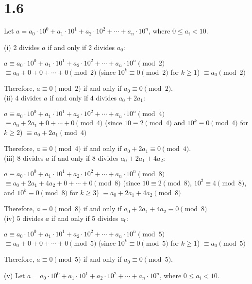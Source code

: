 \documentclass{article}
\begin{document}
\section{1.6}
\begin{solution}
    Let $a = a_0 \cdot 10^0 + a_1 \cdot 10^1 + a_2 \cdot 10^2 + \cdots + a_n \cdot 10^n$, where $0 \leq a_i < 10$.

(i) 2 divides $a$ if and only if 2 divides $a_0$:

$a \equiv a_0 \cdot 10^0 + a_1 \cdot 10^1 + a_2 \cdot 10^2 + \cdots + a_n \cdot 10^n \pmod{2}$
$\equiv a_0 + 0 + 0 + \cdots + 0 \pmod{2}$ (since $10^k \equiv 0 \pmod{2}$ for $k \geq 1$)
$\equiv a_0 \pmod{2}$

Therefore, $a \equiv 0 \pmod{2}$ if and only if $a_0 \equiv 0 \pmod{2}$. \\

(ii) 4 divides $a$ if and only if 4 divides $a_0 + 2a_1$:

$a \equiv a_0 \cdot 10^0 + a_1 \cdot 10^1 + a_2 \cdot 10^2 + \cdots + a_n \cdot 10^n \pmod{4}$
$\equiv a_0 + 2a_1 + 0 + \cdots + 0 \pmod{4}$ (since $10 \equiv 2 \pmod{4}$ and $10^k \equiv 0 \pmod{4}$ for $k \geq 2$)
$\equiv a_0 + 2a_1 \pmod{4}$

Therefore, $a \equiv 0 \pmod{4}$ if and only if $a_0 + 2a_1 \equiv 0 \pmod{4}$. \\ 

(iii) 8 divides $a$ if and only if 8 divides $a_0 + 2a_1 + 4a_2$:

$a \equiv a_0 \cdot 10^0 + a_1 \cdot 10^1 + a_2 \cdot 10^2 + \cdots + a_n \cdot 10^n \pmod{8}$
$\equiv a_0 + 2a_1 + 4a_2 + 0 + \cdots + 0 \pmod{8}$ (since $10 \equiv 2 \pmod{8}$, $10^2 \equiv 4 \pmod{8}$, and $10^k \equiv 0 \pmod{8}$ for $k \geq 3$)
$\equiv a_0 + 2a_1 + 4a_2 \pmod{8}$

Therefore, $a \equiv 0 \pmod{8}$ if and only if $a_0 + 2a_1 + 4a_2 \equiv 0 \pmod{8}$ \\

(iv) 5 divides $a$ if and only if 5 divides $a_0$:

$a \equiv a_0 \cdot 10^0 + a_1 \cdot 10^1 + a_2 \cdot 10^2 + \cdots + a_n \cdot 10^n \pmod{5}$
$\equiv a_0 + 0 + 0 + \cdots + 0 \pmod{5}$ (since $10^k \equiv 0 \pmod{5}$ for $k \geq 1$)
$\equiv a_0 \pmod{5}$

Therefore, $a \equiv 0 \pmod{5}$ if and only if $a_0 \equiv 0 \pmod{5}$.

(v) Let $a = a_0 \cdot 10^0 + a_1 \cdot 10^1 + a_2 \cdot 10^2 + \cdots + a_n \cdot 10^n$, where $0 \leq a_i < 10$.


\end{solution}
\end{document}
